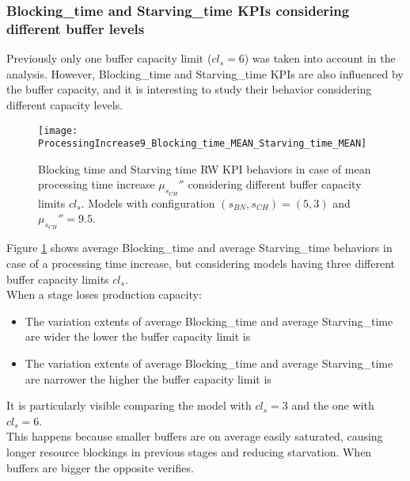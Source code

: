 \subsubsection{Blocking\_time and Starving\_time KPIs considering different buffer levels}
Previously only one buffer capacity limit ($cl_s=6$) was taken into account in the analysis. However, Blocking\_time and Starving\_time KPIs are also influenced by the buffer capacity, and it is interesting to study their behavior considering different capacity levels.
\begin{figure}[h] 
\centering
\texttt{[image: ProcessingIncrease9\_Blocking\_time\_MEAN\_Starving\_time\_MEAN]}
\caption[Blocking time and Starving time RW KPIs behaviors in case of processing time increase considering different buffer capacity limits]{Blocking time and Starving time RW KPI behaviors in case of mean processing time increase $\mu_{s_{CH}}''$ considering different buffer capacity limits $cl_s$. Models with configuration $(s_{BN},s_{CH})=(5,3)$ and $\mu_{s_{CH}}''=9.5$.}
\label{fig:Blocking time and Starving time RW KPIs behavior in case of processing time increase considering different buffer capacity limits}
\end{figure}
Figure \ref{fig:Blocking time and Starving time RW KPIs behavior in case of processing time increase considering different buffer capacity limits} shows average Blocking\_time and average Starving\_time behaviors in case of a processing time increase, but considering models having three different buffer capacity limits $cl_s$. \\
When a stage loses production capacity:
\begin{itemize}
\item The variation extents of average Blocking\_time and average Starving\_time are wider the lower the buffer capacity limit is
\item The variation extents of average Blocking\_time and average Starving\_time are narrower the higher the buffer capacity limit is
\end{itemize}
It is particularly visible comparing the model with $cl_s=3$ and the one with $cl_s=6$. \\
This happens because smaller buffers are on average easily saturated, causing longer resource blockings in previous stages and reducing starvation. When buffers are bigger the opposite verifies.
